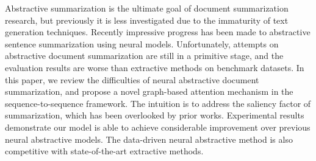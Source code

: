 Abstractive summarization is the ultimate goal of document summarization research, but previously it is less investigated due to the immaturity of text generation techniques. Recently impressive progress has been made to abstractive sentence summarization using neural models. Unfortunately, attempts on abstractive document summarization are still in a primitive stage, and the evaluation results are worse than extractive methods on benchmark datasets. In this paper, we review the difficulties of neural abstractive document summarization, and propose a novel graph-based attention mechanism in the sequence-to-sequence framework. The intuition is to address the saliency factor of summarization, which has been overlooked by prior works. Experimental results demonstrate our model is able to achieve considerable improvement over previous neural abstractive models. The data-driven neural abstractive method is also competitive with state-of-the-art extractive methods.

